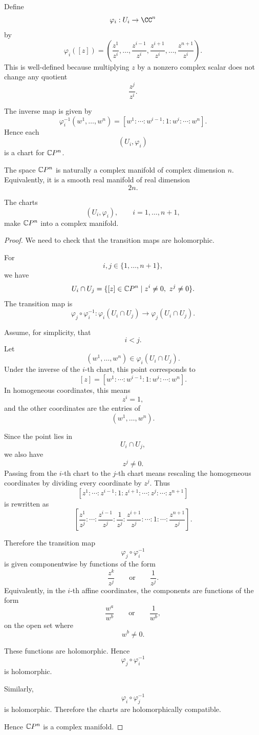 Define
\[
  \varphi_i:U_i\to\CC^n
\]
by
\[
  \varphi_i([z])
  =
  \left(
    \frac{z^1}{z^i},
    \dots,
    \frac{z^{i-1}}{z^i},
    \frac{z^{i+1}}{z^i},
    \dots,
    \frac{z^{n+1}}{z^i}
  \right).
\]
This is well-defined because multiplying $z$ by a nonzero complex scalar does not change any quotient
\[
  \frac{z^j}{z^i}.
\]

The inverse map is given by
\[
  \varphi_i^{-1}(w^1,\dots,w^n)
  =
  [w^1:\cdots:w^{i-1}:1:w^i:\cdots:w^n].
\]
Hence each
\[
  (U_i,\varphi_i)
\]
is a chart for $\mathbb{C}P^n$.

\begin{remark}
The space $\mathbb{C}P^n$ is naturally a complex manifold of complex dimension $n$.
Equivalently, it is a smooth real manifold of real dimension
\[
  2n.
\]
\end{remark}

\begin{claim*}
The charts
\[
  (U_i,\varphi_i),
  \qquad
  i=1,\dots,n+1,
\]
make $\mathbb{C}P^n$ into a complex manifold.
\end{claim*}

\begin{proof}
We need to check that the transition maps are holomorphic.

For
\[
  i,j\in\{1,\dots,n+1\},
\]
we have
\[
  U_i\cap U_j
  =
  \{[z]\in\mathbb{C}P^n\mid z^i\neq 0,\ z^j\neq 0\}.
\]
The transition map is
\[
  \varphi_j\circ \varphi_i^{-1}
  :
  \varphi_i(U_i\cap U_j)
  \to
  \varphi_j(U_i\cap U_j).
\]

Assume, for simplicity, that
\[
  i<j.
\]
Let
\[
  (w^1,\dots,w^n)\in \varphi_i(U_i\cap U_j).
\]
Under the inverse of the $i$-th chart, this point corresponds to
\[
  [z]
  =
  [w^1:\cdots:w^{i-1}:1:w^i:\cdots:w^n].
\]
In homogeneous coordinates, this means
\[
  z^i=1,
\]
and the other coordinates are the entries of
\[
  (w^1,\dots,w^n).
\]

Since the point lies in
\[
  U_i\cap U_j,
\]
we also have
\[
  z^j\neq 0.
\]
Passing from the $i$-th chart to the $j$-th chart means rescaling the homogeneous coordinates by dividing every coordinate by $z^j$. Thus
\[
  [z^1:\cdots:z^{i-1}:1:z^{i+1}:\cdots:z^{j}:\cdots:z^{n+1}]
\]
is rewritten as
\[
  \left[
    \frac{z^1}{z^j}:
    \cdots:
    \frac{z^{i-1}}{z^j}:
    \frac{1}{z^j}:
    \frac{z^{i+1}}{z^j}:
    \cdots:
    1:
    \cdots:
    \frac{z^{n+1}}{z^j}
  \right].
\]

Therefore the transition map
\[
  \varphi_j\circ\varphi_i^{-1}
\]
is given componentwise by functions of the form
\[
  \frac{z^k}{z^j}
  \qquad\text{or}\qquad
  \frac{1}{z^j}.
\]
Equivalently, in the $i$-th affine coordinates, the components are functions of the form
\[
  \frac{w^a}{w^b}
  \qquad\text{or}\qquad
  \frac{1}{w^b},
\]
on the open set where
\[
  w^b\neq 0.
\]

These functions are holomorphic. Hence
\[
  \varphi_j\circ\varphi_i^{-1}
\]
is holomorphic.

Similarly,
\[
  \varphi_i\circ\varphi_j^{-1}
\]
is holomorphic. Therefore the charts are holomorphically compatible.

Hence $\mathbb{C}P^n$ is a complex manifold.
\end{proof}


